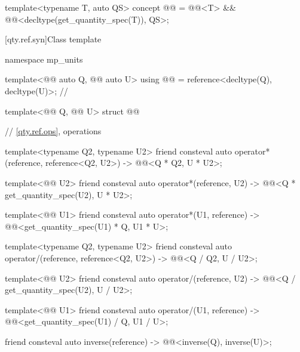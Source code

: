 \begin{itemdecl}
template<typename T, auto QS>
concept @@ = @@<T> && @@<decltype(get_quantity_spec(T{})), QS>;
\end{itemdecl}

[qty.ref.syn]{Class template }

\begin{codeblock}
namespace mp_units {

template<@@ auto Q, @@ auto U>
using @@ = reference<decltype(Q), decltype(U)>;  // \expos

template<@@ Q, @@ U>
struct @@ {
  // \ref{qty.ref.ops}, operations

  template<typename Q2, typename U2>
  friend consteval auto operator*(reference, reference<Q2, U2>)
    -> @@<Q{} * Q2{}, U{} * U2{}>;

  template<@@ U2>
  friend consteval auto operator*(reference, U2)
    -> @@<Q{} * get_quantity_spec(U2{}), U{} * U2{}>;

  template<@@ U1>
  friend consteval auto operator*(U1, reference)
    -> @@<get_quantity_spec(U1{}) * Q{}, U1{} * U{}>;

  template<typename Q2, typename U2>
  friend consteval auto operator/(reference, reference<Q2, U2>)
    -> @@<Q{} / Q2{}, U{} / U2{}>;

  template<@@ U2>
  friend consteval auto operator/(reference, U2)
    -> @@<Q{} / get_quantity_spec(U2{}), U{} / U2{}>;

  template<@@ U1>
  friend consteval auto operator/(U1, reference)
    -> @@<get_quantity_spec(U1{}) / Q{}, U1{} / U{}>;

  friend consteval auto inverse(reference) -> @@<inverse(Q{}), inverse(U{})>;

}}
\end{codeblock}
